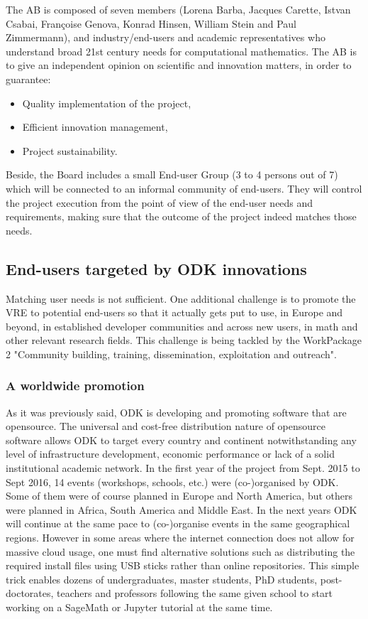 \documentclass{deliverablereport}
\begin{document}
The AB is composed of seven members (Lorena Barba, Jacques Carette,
Istvan Csabai, Françoise Genova, Konrad Hinsen, William Stein and Paul
Zimmermann), and industry/end-users and academic representatives who
understand broad 21st century needs for computational mathematics.
The AB is to give an independent opinion on scientific and innovation
matters, in order to guarantee:

\begin{itemize}
\item Quality implementation of the project,
\item Efficient innovation management,
\item Project sustainability.
\end{itemize}

Beside, the Board includes a small End-user Group (3 to 4 persons out
of 7) which will be connected to an informal community of
end-users. They will control the project execution from the point of
view of the end-user needs and requirements, making sure that the
outcome of the project indeed matches those needs.

\subsection{End-users targeted by ODK innovations}

Matching user needs is not sufficient. One additional challenge is to
promote the VRE to potential end-users so that it actually gets put to
use, in Europe and beyond, in established developer communities and
across new users, in math and other relevant research fields. This
challenge is being tackled by the WorkPackage 2 "Community building,
training, dissemination, exploitation and outreach".


\subsubsection{A worldwide promotion}

As it was previously said, ODK is developing and promoting software that are opensource. The universal and cost-free distribution nature of opensource software allows ODK to target every country and continent notwithstanding any level of infrastructure development, economic performance or lack of a solid institutional academic network.
In the first year of the project from Sept. 2015 to Sept 2016, 14 events (workshops, schools, etc.) were (co-)organised by ODK. Some of them were of course planned in Europe and North America, but others were planned in Africa, South America and Middle East. In the next years ODK will continue at the same pace to (co-)organise events in the same geographical regions.
However in some areas where the internet connection does not allow for massive cloud usage, one must find alternative solutions such as distributing the required install files using USB sticks  rather than online repositories. This simple trick enables dozens of undergraduates, master students, PhD students, post-doctorates, teachers and professors following the same given school to start working on a SageMath or Jupyter tutorial at the same time.
\end{document}
